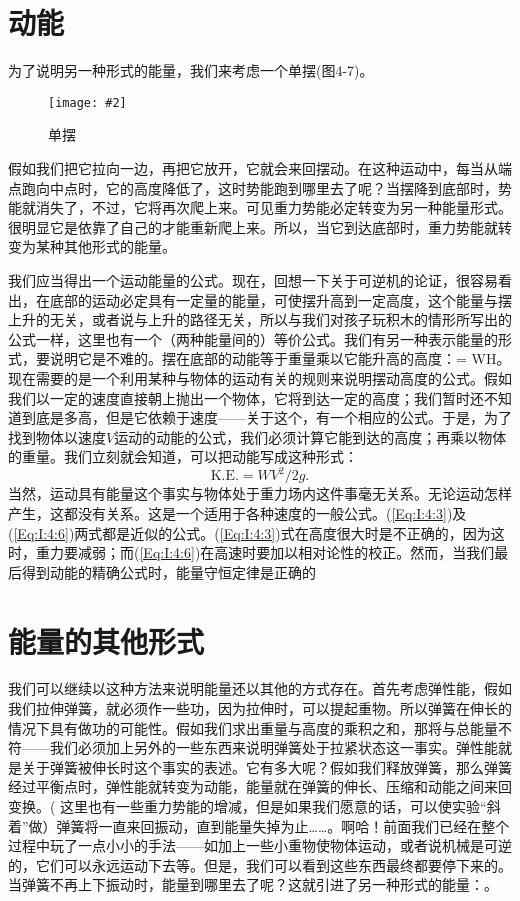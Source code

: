 \documentclass[12pt,oneside]{book}
\newenvironment{fig}[2][1]
{\begin{figure}[H]
\centering
\texttt{[image: \#2]}}
{\end{figure}}
\begin{document}
\section{动能}
为了说明另一种形式的能量，我们来考虑一个单摆(图4-7)。
\begin{fig}{单摆}
\caption{单摆}
\label{fig:单摆}
\end{fig}
假如我们把它拉向一边，再把它放开，它就会来回摆动。在这种运动中，每当从端点跑向中点时，它的高度降低了，这时势能跑到哪里去了呢？当摆降到底部时，势能就消失了，不过，它将再次爬上来。可见重力势能必定转变为另一种能量形式。很明显它是依靠了自己的才能重新爬上来。所以，当它到达底部时，重力势能就转变为某种其他形式的能量。

我们应当得出一个运动能量的公式。现在，回想一下关于可逆机的论证，很容易看出，在底部的运动必定具有一定量的能量，可使摆升高到一定高度，这个能量与摆上升的无关，或者说与上升的路径无关，所以与我们对孩子玩积木的情形所写出的公式一样，这里也有一个（两种能量间的）等价公式。我们有另一种表示能量的形式，要说明它是不难的。摆在底部的动能等于重量乘以它能升高的高度：= WH。现在需要的是一个利用某种与物体的运动有关的规则来说明摆动高度的公式。假如我们以一定的速度直接朝上抛出一个物体，它将到达一定的高度；我们暂时还不知道到底是多高，但是它依赖于速度——关于这个，有一个相应的公式。于是，为了找到物体以速度$ V $运动的动能的公式，我们必须计算它能到达的高度；再乘以物体的重量。我们立刻就会知道，可以把动能写成这种形式：
\begin{equation}
\label{Eq:I:4:6}
\text{K.E.}=WV^2/2g.
\end{equation}
当然，运动具有能量这个事实与物体处于重力场内这件事毫无关系。无论运动怎样产生，这都没有关系。这是一个适用于各种速度的一般公式。(\ref{Eq:I:4:3})及(\ref{Eq:I:4:6})两式都是近似的公式。(\ref{Eq:I:4:3})式在高度很大时是不正确的，因为这时，重力要减弱；而(\ref{Eq:I:4:6})在高速时要加以相对论性的校正。然而，当我们最后得到动能的精确公式时，能量守恒定律是正确的


\section{能量的其他形式}
我们可以继续以这种方法来说明能量还以其他的方式存在。首先考虑弹性能，假如我们拉伸弹簧，就必须作一些功，因为拉伸时，可以提起重物。所以弹簧在伸长的情况下具有做功的可能性。假如我们求出重量与高度的乘积之和，那将与总能量不符——我们必须加上另外的一些东西来说明弹簧处于拉紧状态这一事实。弹性能就是关于弹簧被伸长时这个事实的表述。它有多大呢？假如我们释放弹簧，那么弹簧经过平衡点时，弹性能就转变为动能，能量就在弹簧的伸长、压缩和动能之间来回变换。( 这里也有一些重力势能的增减，但是如果我们愿意的话，可以使实验“斜着”做）弹簧将一直来回振动，直到能量失掉为止……。啊哈！前面我们已经在整个过程中玩了一点小小的手法——如加上一些小重物使物体运动，或者说机械是可逆的，它们可以永远运动下去等。但是，我们可以看到这些东西最终都要停下来的。当弹簧不再上下振动时，能量到哪里去了呢？这就引进了另一种形式的能量：。
\end{document}
